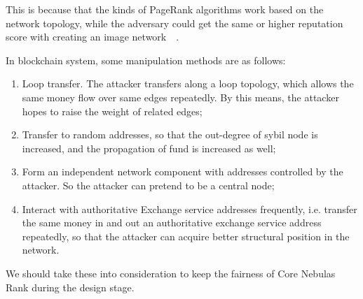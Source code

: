 This is because that the kinds of PageRank algorithms work based on the network topology, while the adversary could get the same or higher reputation score with creating an image network~\cite{cheng2005sybilproof}~\cite{cheng2006manipulability}.

In blockchain system, some manipulation methods are as follows:
\begin{enumerate}
\item Loop transfer. The attacker transfers along a loop topology, which allows the same money flow over same edges repeatedly. By this means, the attacker hopes to raise the weight of related edges;
\item Transfer to random addresses, so that the out-degree of sybil node is increased, and the propagation of fund is increased as well;
\item Form an independent network component with addresses controlled by the attacker. So the attacker can pretend to be a central node;
\item Interact with authoritative Exchange service addresses frequently, i.e. transfer the same money in and out an authoritative exchange service address repeatedly, so that the attacker can acquire better structural position in the network.
\end{enumerate}

We should take these into consideration to keep the fairness of Core Nebulas Rank during the design stage.

